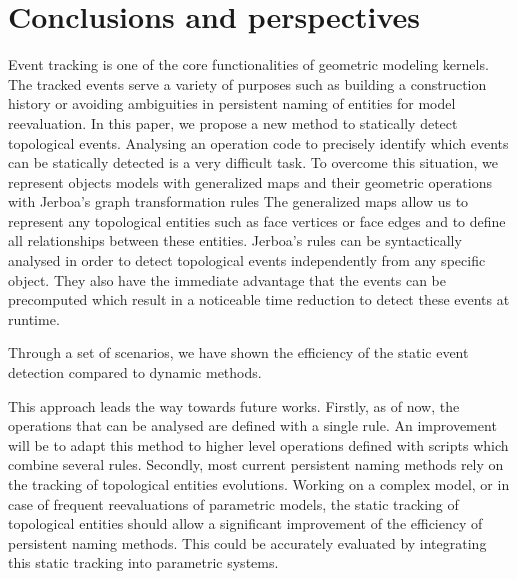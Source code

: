 \section{Conclusions and perspectives}
\label{sec:conclusion}

Event tracking is one of the core functionalities of geometric modeling kernels.
The tracked events serve a variety of purposes such as building a construction history or avoiding ambiguities in persistent naming of entities for model reevaluation.
In this paper, we propose a new method to statically detect topological events.
Analysing an operation code to precisely identify which events can be statically detected is a very difficult task. To overcome this situation, we represent objects models with generalized maps and their geometric operations with Jerboa's graph transformation rules
The generalized maps allow us to represent any topological entities such as face vertices or face edges and to define all relationships between these entities.
Jerboa's rules can be syntactically analysed in order to detect topological events independently from any specific object.
They also have the immediate advantage that the events can be precomputed which result in a noticeable time reduction to detect these events at runtime.

Through a set of scenarios, we have shown the efficiency of the static event detection compared to dynamic methods.

This approach leads the way towards future works.
Firstly, as of now, the operations that can be analysed are defined with a single rule. An improvement will be to adapt this method to higher level operations defined with scripts which combine several rules.
Secondly, most current persistent naming methods rely on the tracking of topological entities evolutions. Working on a complex model, or in case of frequent reevaluations of parametric models, the static tracking of topological entities should allow a significant improvement of the efficiency of persistent naming methods. This could be accurately evaluated by integrating this static tracking into parametric systems.

